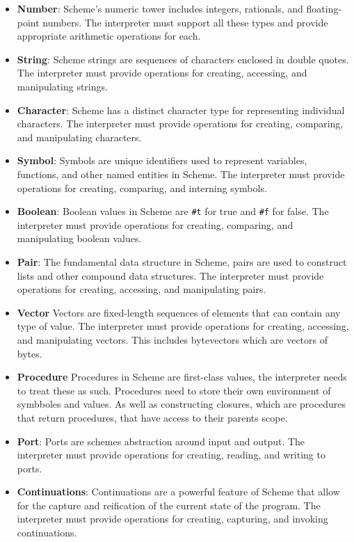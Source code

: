 \documentclass[final]{cmpreport_02}
\begin{document}
\begin{itemize}
    \item \textbf{Number}: Scheme's numeric tower includes integers, rationals, and floating-point numbers. The interpreter must support all these types and provide appropriate arithmetic operations for each.
    \item \textbf{String}: Scheme strings are sequences of characters enclosed in double quotes. The interpreter must provide operations for creating, accessing, and manipulating strings.
    \item \textbf{Character}: Scheme has a distinct character type for representing individual characters. The interpreter must provide operations for creating, comparing, and manipulating characters.
    \item \textbf{Symbol}: Symbols are unique identifiers used to represent variables, functions, and other named entities in Scheme. The interpreter must provide operations for creating, comparing, and interning symbols.
    \item \textbf{Boolean}: Boolean values in Scheme are \texttt{\#t} for true and \texttt{\#f} for false. The interpreter must provide operations for creating, comparing, and manipulating boolean values.
    \item \textbf{Pair}: The fundamental data structure in Scheme, pairs are used to construct lists and other compound data structures. The interpreter must provide operations for creating, accessing, and manipulating pairs.
    \item \textbf{Vector} Vectors are fixed-length sequences of elements that can contain any type of value. The interpreter must provide operations for creating, accessing, and manipulating vectors. This includes bytevectors which are vectors of bytes.
    \item \textbf{Procedure} Procedures in Scheme are first-class values, the interpreter needs to treat these as such. Procedures need to store their own environment of symbboles and values. As well as constructing closures, which are procedures that return procedures, that have access to their parents scope.
    \item \textbf{Port}: Ports are schemes abstraction around input and output. The interpreter must provide operations for creating, reading, and writing to ports.
    \item \textbf{Continuations}: Continuations are a powerful feature of Scheme that allow for the capture and reification of the current state of the program. The interpreter must provide operations for creating, capturing, and invoking continuations.
\end{itemize}
\end{document}

